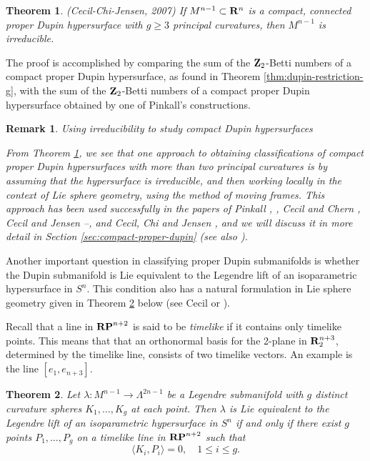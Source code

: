 \documentclass[12pt]{article}
\newtheorem{theorem}{Theorem}[section]
\newtheorem{remark}{Remark}[section]
\begin{document}
{\begin{theorem}
\label{thm:CCJ-2007}
(Cecil-Chi-Jensen, 2007)
If $M^{n-1} \subset {\bf R}^n$ is a compact, connected proper Dupin hypersurface with $g \geq 3$
principal curvatures, then $M^{n-1}$ is irreducible.
\end{theorem}


The proof is accomplished by comparing the sum of the  ${\bf Z}_2$-Betti numbers 
of a compact proper Dupin hypersurface, as found in Theorem \ref{thm:dupin-restriction-g}, 
with the sum of
the  ${\bf Z}_2$-Betti numbers of a compact proper Dupin hypersurface obtained by one of Pinkall's constructions. 


\begin{remark}{Using irreducibility to study compact Dupin hypersurfaces}
\label{rem:irreducibility}

\noindent
{\rm From Theorem \ref{thm:CCJ-2007}, we see that 
one approach to obtaining classifications of compact proper Dupin hypersurfaces with more
than two principal curvatures is by assuming that the hypersurface is irreducible, and 
then working locally in the context of Lie sphere geometry, using the method of moving frames.  This approach has been used successfully in the papers of 
Pinkall \cite{P1}, \cite{P3}, Cecil and Chern \cite{CC2}, Cecil and Jensen \cite{CJ2}--\cite{CJ3}, 
and Cecil, Chi and Jensen \cite{CCJ2}, and  we will discuss it in more detail in Section \ref{sec:compact-proper-dupin}
(see also \cite[pp. 168--190]{Cec9}).}
\end{remark}


Another important question in classifying proper Dupin
submanifolds is whether the Dupin submanifold is Lie equivalent to the Legendre lift of
an isoparametric hypersurface in $S^n$.  This condition
also has a natural formulation in Lie sphere geometry given in Theorem \ref{thm:lie-eq-isop-hyp} below
(see Cecil  \cite{CecKod} or \cite[p. 77]{Cec9}).

Recall
that a line in ${\bf RP}^{n+2}$ is said to be {\em timelike} if
it contains only timelike points.  This means that that
an orthonormal basis for the 2-plane in  ${\bf R}_2^{n+3}$,
determined by the timelike line, consists of two timelike
vectors.  An example is the line $[e_1,e_{n+3}]$.

\begin{theorem}
\label{thm:lie-eq-isop-hyp}
Let $\lambda : M^{n-1} \rightarrow \Lambda ^{2n-1}$ be
a Legendre submanifold with $g$ distinct curvature spheres
$K_1,\ldots,K_g$ at each point.  Then $\lambda$ is
Lie equivalent to the Legendre lift of an
isoparametric hypersurface in $S^n$ if and only if there
exist $g$ points $P_1,\ldots,P_g$ on a timelike line in
${\bf RP}^{n+2}$ such that 
\begin{equation}
\label{eq:lie-geometric-criterion-isop-hyp}
\langle K_i,P_i \rangle = 0, \quad 1 \leq i \leq g.
\end{equation}
\end{theorem}

}
\end{document}
